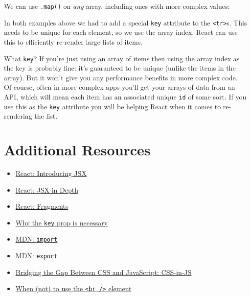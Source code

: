 \pagebreak


We can use \texttt{.map()} on \textit{any} array, including ones with more complex values:


In both examples above we had to add a special \texttt{key} attribute to the \texttt{<tr>}s. This needs to be unique for each element, so we use the array index. React can use this to efficiently re-render large lists of items.

\pagebreak

\begin{infobox}{What \texttt{key}?}
    If you're just using an array of items then using the array index as the key is probably fine: it's guaranteed to be unique (unlike the items in the array). But it won't give you any performance benefits in more complex code.
    \\

    Of course, often in more complex apps you'll get your arrays of data from an API, which will mean each item has an associated unique \texttt{id} of some sort. If you use this as the \texttt{key} attribute you will be helping React when it comes to re-rendering the list.
\end{infobox}



\section{Additional Resources}

\begin{itemize}[leftmargin=*]
    \item \href{https://reactjs.org/docs/introducing-jsx.html}{React: Introducing JSX}
    \item \href{https://reactjs.org/docs/jsx-in-depth.html}{React: JSX in Depth}
    \item \href{https://reactjs.org/docs/fragments.html}{React: Fragments}
    \item \href{https://egghead.io/lessons/react-use-the-key-prop-when-rendering-a-list-with-react}{Why the \texttt{key} prop is necessary}
    \item \href{https://developer.mozilla.org/en-US/docs/Web/JavaScript/Reference/Statements/import}{MDN: \texttt{import}}
    \item \href{https://developer.mozilla.org/en-US/docs/Web/JavaScript/Reference/Statements/export}{MDN: \texttt{export}}
    \item \href{https://css-tricks.com/bridging-the-gap-between-css-and-javascript-css-in-js/}{Bridging the Gap Between CSS and JavaScript: CSS-in-JS}
    \item \href{https://webplatform.news/issues/2020-04-29#when-not-to-use-the-br-element}{When (not) to use the \texttt{<br />} element}
\end{itemize}
